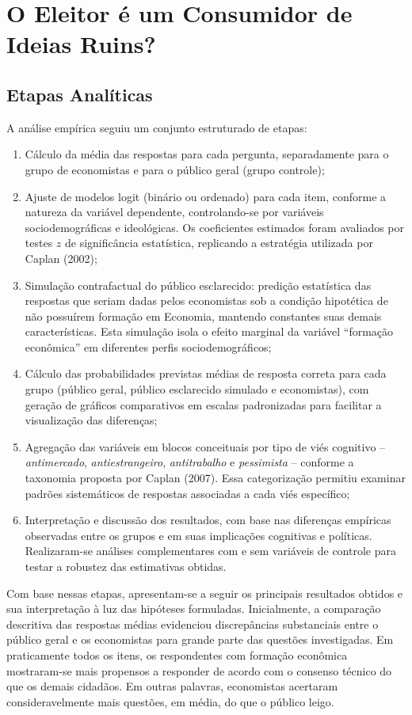 \chapter{O Eleitor é um Consumidor de Ideias Ruins?} 
\section{Etapas Analíticas} A análise empírica seguiu um conjunto estruturado de etapas: \begin{enumerate}[label=(\alph*)]
	\item Cálculo da média das respostas para cada pergunta, separadamente para o grupo de economistas e para o público geral (grupo controle);
	\item Ajuste de modelos logit (binário ou ordenado) para cada item, conforme a natureza da variável dependente, controlando-se por variáveis sociodemográficas e ideológicas. Os coeficientes estimados foram avaliados por testes $z$ de significância estatística, replicando a estratégia utilizada por Caplan (2002);
	\item Simulação contrafactual do público esclarecido: predição estatística das respostas que seriam dadas pelos economistas sob a condição hipotética de não possuírem formação em Economia, mantendo constantes suas demais características. Esta simulação isola o efeito marginal da variável “formação econômica” em diferentes perfis sociodemográficos;
	\item Cálculo das probabilidades previstas médias de resposta correta para cada grupo (público geral, público esclarecido simulado e economistas), com geração de gráficos comparativos em escalas padronizadas para facilitar a visualização das diferenças;
	\item Agregação das variáveis em blocos conceituais por tipo de viés cognitivo -- \textit{antimercado}, \textit{antiestrangeiro}, \textit{antitrabalho} e \textit{pessimista} -- conforme a taxonomia proposta por Caplan (2007). Essa categorização permitiu examinar padrões sistemáticos de respostas associadas a cada viés específico;
	\item Interpretação e discussão dos resultados, com base nas diferenças empíricas observadas entre os grupos e em suas implicações cognitivas e políticas. Realizaram-se análises complementares com e sem variáveis de controle para testar a robustez das estimativas obtidas.
\end{enumerate} 

Com base nessas etapas, apresentam-se a seguir os principais resultados obtidos e sua interpretação à luz das hipóteses formuladas. Inicialmente, a comparação descritiva das respostas médias evidenciou discrepâncias substanciais entre o público geral e os economistas para grande parte das questões investigadas. Em praticamente todos os itens, os respondentes com formação econômica mostraram-se mais propensos a responder de acordo com o consenso técnico do que os demais cidadãos. Em outras palavras, economistas acertaram consideravelmente mais questões, em média, do que o público leigo. 

